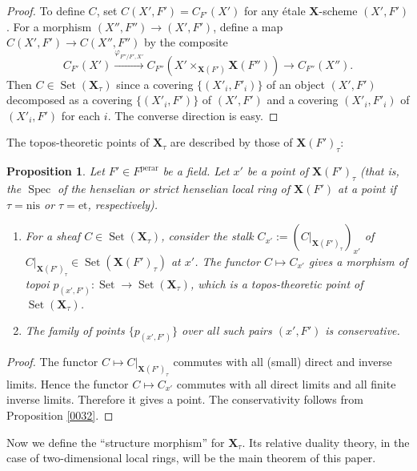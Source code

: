 \documentclass{amsart}
\newtheorem{Prop}[Thm]{Proposition}
\theoremstyle{remark}
\numberwithin{equation}{subsection}
\newcommand{\et}{\mathrm{et}}
\newcommand{\perar}{\mathrm{perar}}
\newcommand{\alg}[1]{\mathbf{#1}}
\newcommand{\nis}{\mathrm{nis}}
\DeclareMathOperator{\Spec}{Spec}
\DeclareMathOperator{\Set}{Set}
\begin{document}
\begin{proof}
	To define $C$, set $C(X', F') = C_{F'}(X')$ for any \'etale $\alg{X}$-scheme $(X', F')$.
	For a morphism $(X'', F'') \to (X', F')$,
	define a map $C(X', F') \to C(X'', F'')$ by the composite
		\[
				C_{F'}(X')
			\xrightarrow{\varphi_{F'' / F', X'}}
				C_{F''}(X' \times_{\alg{X}(F')} \alg{X}(F''))
			\to
				C_{F''}(X'').
		\]
	Then $C \in \Set(\alg{X}_{\tau})$
	since a covering $\{(X'_{i}, F'_{i})\}$ of an object $(X', F')$ decomposed as a covering
	$\{(X'_{i}, F')\}$ of $(X', F')$ and a covering
	$(X'_{i}, F'_{i})$ of $(X'_{i}, F')$ for each $i$.
	The converse direction is easy.
\end{proof}

The topos-theoretic points of $\alg{X}_{\tau}$ are described by
those of $\alg{X}(F')_{\tau}$:

\begin{Prop} \label{0166}
	Let $F' \in F^{\perar}$ be a field.
	Let $x'$ be a point of $\alg{X}(F')_{\tau}$
	(that is, the $\Spec$ of the henselian or strict henselian local ring of $\alg{X}(F')$ at a point
	if $\tau = \nis$ or $\tau = \et$, respectively).
	\begin{enumerate}
		\item \label{0167}
			For a sheaf $C \in \Set(\alg{X}_{\tau})$,
			consider the stalk $C_{x'} := (C|_{\alg{X}(F')_{\tau}})_{x'}$
			of $C|_{\alg{X}(F')_{\tau}} \in \Set(\alg{X}(F')_{\tau})$ at $x'$.
			The functor $C \mapsto C_{x'}$ gives a morphism of topoi
			$p_{(x', F')} \colon \Set \to \Set(\alg{X}_{\tau})$,
			which is a topos-theoretic point of $\Set(\alg{X}_{\tau})$.
		\item \label{0168}
			The family of points $\{p_{(x', F')}\}$ over all such pairs $(x', F')$ is conservative.
	\end{enumerate}
\end{Prop}

\begin{proof}
	The functor $C \mapsto C|_{\alg{X}(F')_{\tau}}$ commutes with all (small) direct and inverse limits.
	Hence the functor $C \mapsto C_{x'}$ commutes with all direct limits and all finite inverse limits.
	Therefore it gives a point.
	The conservativity follows from
	Proposition \ref{0032}.
\end{proof}

Now we define the ``structure morphism'' for $\alg{X}_{\tau}$.
Its relative duality theory, in the case of two-dimensional local rings,
will be the main theorem of this paper.
\end{document}
